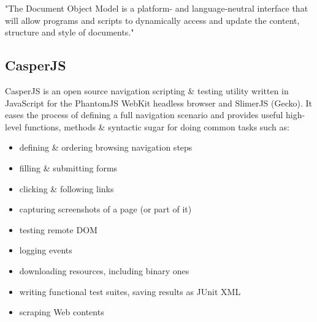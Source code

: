 "The Document Object Model is a platform- and language-neutral interface that will allow programs and scripts to dynamically access and update the content, structure and style of documents." \cite{w3cDOM}
	\subsection{CasperJS}
		\cite{casperjs}
		CasperJS is an open source navigation scripting \& testing utility written in JavaScript for the PhantomJS WebKit headless browser and SlimerJS (Gecko). It eases the process of defining a full navigation scenario and provides useful high-level functions, methods \& syntactic sugar for doing common tasks such as:
\begin{itemize}
	\item defining \& ordering browsing navigation steps
	\item filling \& submitting forms
	\item clicking \& following links
	\item capturing screenshots of a page (or part of it)
	\item testing remote DOM
	\item logging events
	\item downloading resources, including binary ones
	\item writing functional test suites, saving results as JUnit XML
	\item scraping Web contents
\end{itemize}

	

